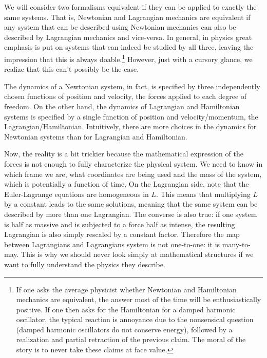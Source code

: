 We will consider two formalisms equivalent if they can be applied to exactly the same systems. That is, Newtonian and Lagrangian mechanics are equivalent if any system that can be described using Newtonian mechanics can also be described by Lagrangian mechanics and vice-versa. In general, in physics great emphasis is put on systems that can indeed be studied by all three, leaving the impression that this is always doable.\footnote{If one asks the average physicist whether Newtonian and Hamiltonian mechanics are equivalent, the answer most of the time will be  enthusiastically positive. If one then asks for the Hamiltonian for a damped harmonic oscillator, the typical reaction is annoyance due to the nonsensical question (damped harmonic oscillators do not conserve energy), followed by a realization and partial retraction of the previous claim. The moral of the story is to never take these claims at face value.} However, just with a cursory glance, we realize that this can't possibly be the case.

The dynamics of a Newtonian system, in fact, is specified by three independently chosen functions of position and velocity, the forces applied to each degree of freedom. On the other hand, the dynamics of Lagrangian and Hamiltonian systems is specified by a single function of position and velocity/momentum, the Lagrangian/Hamiltonian. Intuitively, there are more choices in the dynamics for Newtonian systems than for Lagrangian and Hamiltonian.

Now, the reality is a bit trickier because the mathematical expression of the forces is not enough to fully characterize the physical system. We need to know in which frame we are, what coordinates are being used and the mass of the system, which is potentially a function of time. On the Lagrangian side, note that the Euler-Lagrange equations are homogeneous in $L$. This means that multiplying $L$ by a constant leads to the same solutions, meaning that the same system can be described by more than one Lagrangian. The converse is also true: if one system is half as massive and is subjected to a force half as intense, the resulting Lagrangian is also simply rescaled by a constant factor. Therefore the map between Lagrangians and Lagrangians system is not one-to-one: it is many-to-may. This is why we should never look simply at mathematical structures if we want to fully understand the physics they describe.

